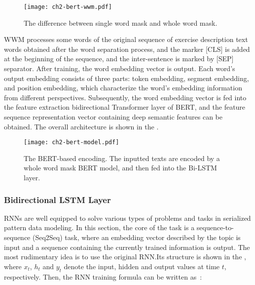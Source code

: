 \begin{figure}[htbp!]
    \centering
    \texttt{[image: ch2-bert-wwm.pdf]}
    \caption{The difference between single word mask and whole word mask.}\label{fig:ch2-bert-wwm}
\end{figure}


WWM processes some words of the original sequence of exercise description text words obtained after the word separation process, and the marker [CLS] is added at the beginning of the sequence, and the inter-sentence is marked by [SEP] separator. After training, the word embedding vector is output. Each word's output embedding consists of three parts: token embedding, segment embedding, and position embedding, which characterize the word's embedding information from different perspectives. Subsequently, the word embedding vector is fed into the feature extraction bidirectional Transformer layer of BERT, and the feature sequence representation vector containing deep semantic features can be obtained. The overall architecture is shown in the \figname{\ref{fig:ch2-bert-model}}.

\begin{figure}[htb]
    \centering
    \texttt{[image: ch2-bert-model.pdf]}
    \caption{The BERT-based encoding. The inputted texts are encoded by a whole word mask BERT model, and then fed into the Bi-LSTM layer.}\label{fig:ch2-bert-model}
\end{figure}

\subsubsection{Bidirectional LSTM Layer}

RNNs are well equipped to solve various types of problems and tasks in serialized pattern data modeling. In this section, the core of the task is a sequence-to-sequence (Seq2Seq) task, where an embedding vector described by the topic is input and a sequence containing the currently trained information is output. The most rudimentary idea is to use the original RNN.\@ Its structure is shown in the \figname{\ref{fig:ch2-rnn-model}}, where \(x_t\), \(h_t\) and \(y_t\) denote the input, hidden and output values at time \(t\), respectively. Then, the RNN training formula can be written as~\eqname{\ref{fml:rnn-train}}:

